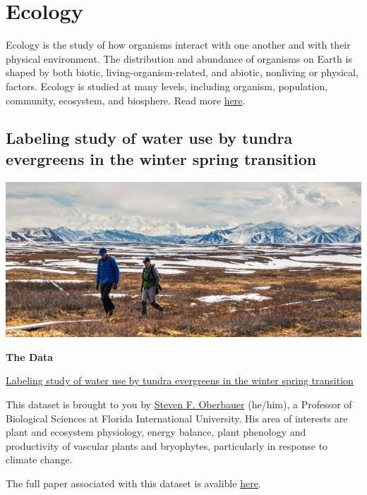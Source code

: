 \documentclass[]{book}
\begin{document}
\hypertarget{ecology}{%
\chapter*{Ecology}\label{ecology}}

Ecology is the study of how organisms interact with one another and with their physical environment. The distribution and abundance of organisms on Earth is shaped by both biotic, living-organism-related, and abiotic, nonliving or physical, factors. Ecology is studied at many levels, including organism, population, community, ecosystem, and biosphere. Read more \href{https://www.khanacademy.org/science/biology/ecology/intro-to-ecology/a/what-is-ecology}{here}.

\hypertarget{this-section}{%
\section*{Labeling study of water use by tundra evergreens in the winter spring transition}\label{this-section}}

\includegraphics{evergreen.jpg}

\textbf{The Data}

\href{https://arcticdata.io/catalog/view/doi\%3A10.18739\%2FA22V2CB1P}{Labeling study of water use by tundra evergreens in the winter spring transition}

This dataset is brought to you by \href{http://faculty.fiu.edu/~oberbaue/}{Steven F. Oberbauer} (he/him), a Professor of Biological Sciences at Florida International University. His area of interests are plant and ecosystem physiology, energy balance, plant phenology and productivity of vascular plants and bryophytes, particularly in response to climate change.

The full paper associated with this dataset is avalible \href{https://bsapubs.onlinelibrary.wiley.com/doi/full/10.3732/ajb.1500358}{here}.
\end{document}
